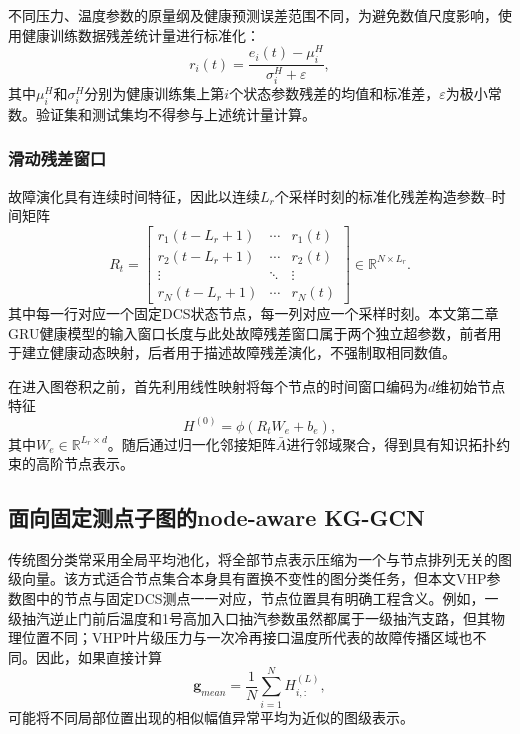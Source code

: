 不同压力、温度参数的原量纲及健康预测误差范围不同，为避免数值尺度影响，使用健康训练数据残差统计量进行标准化：
\begin{equation}
    r_i(t)=\frac{e_i(t)-\mu_i^{H}}{\sigma_i^{H}+\varepsilon},
\end{equation}
其中$\mu_i^{H}$和$\sigma_i^{H}$分别为健康训练集上第$i$个状态参数残差的均值和标准差，$\varepsilon$为极小常数。验证集和测试集均不得参与上述统计量计算。

\subsubsection{滑动残差窗口}

故障演化具有连续时间特征，因此以连续$L_r$个采样时刻的标准化残差构造参数--时间矩阵
\begin{equation}
R_t=
\begin{bmatrix}
 r_1(t-L_r+1)&\cdots&r_1(t)\\
 r_2(t-L_r+1)&\cdots&r_2(t)\\
 \vdots&\ddots&\vdots\\
 r_N(t-L_r+1)&\cdots&r_N(t)
\end{bmatrix}
\in\mathbb R^{N\times L_r}.
\end{equation}
其中每一行对应一个固定DCS状态节点，每一列对应一个采样时刻。本文第二章GRU健康模型的输入窗口长度与此处故障残差窗口属于两个独立超参数，前者用于建立健康动态映射，后者用于描述故障残差演化，不强制取相同数值。

在进入图卷积之前，首先利用线性映射将每个节点的时间窗口编码为$d$维初始节点特征
\begin{equation}
    H^{(0)}=\phi(R_tW_e+b_e),
\end{equation}
其中$W_e\in\mathbb R^{L_r\times d}$。随后通过归一化邻接矩阵$\bar A$进行邻域聚合，得到具有知识拓扑约束的高阶节点表示。

\subsection{面向固定测点子图的node-aware KG-GCN}
\label{subsec:node_aware_v3}

传统图分类常采用全局平均池化，将全部节点表示压缩为一个与节点排列无关的图级向量。该方式适合节点集合本身具有置换不变性的图分类任务，但本文VHP参数图中的节点与固定DCS测点一一对应，节点位置具有明确工程含义。例如，一级抽汽逆止门前后温度和1号高加入口抽汽参数虽然都属于一级抽汽支路，但其物理位置不同；VHP叶片级压力与一次冷再接口温度所代表的故障传播区域也不同。因此，如果直接计算
\begin{equation}
    \mathbf g_{mean}=\frac{1}{N}\sum_{i=1}^{N}H^{(L)}_{i,:},
\end{equation}
可能将不同局部位置出现的相似幅值异常平均为近似的图级表示。

